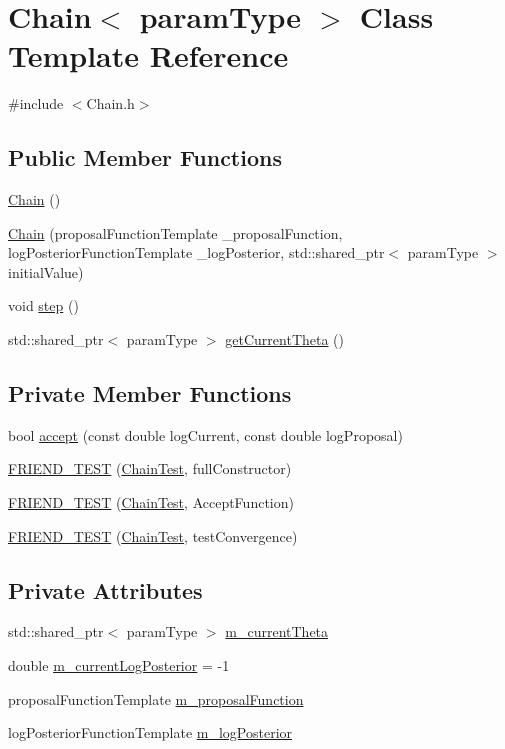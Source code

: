 \hypertarget{classChain}{
\section{Chain$<$ paramType $>$ Class Template Reference}
\label{classChain}
}


{\ttfamily \#include $<$Chain.h$>$}\subsection*{Public Member Functions}
\begin{DoxyCompactItemize}
\item 
\hyperlink{classChain_aa81d495a22785798908076ef5e3191a6}{Chain} ()
\item 
\hyperlink{classChain_ad4bad1f133e8be218275f2b900146840}{Chain} (proposalFunctionTemplate \_\-proposalFunction, logPosteriorFunctionTemplate \_\-logPosterior, std::shared\_\-ptr$<$ paramType $>$ initialValue)
\item 
void \hyperlink{classChain_ad6c694578319523237aa7ee355e9d044}{step} ()
\item 
std::shared\_\-ptr$<$ paramType $>$ \hyperlink{classChain_a44e04b0bc061e651dec369b09b23c226}{getCurrentTheta} ()
\end{DoxyCompactItemize}
\subsection*{Private Member Functions}
\begin{DoxyCompactItemize}
\item 
bool \hyperlink{classChain_a64914a49d1beaea22ef0b3f6464dde8e}{accept} (const double logCurrent, const double logProposal)
\item 
\hyperlink{classChain_ae738aa544270ab0d3c8e3b03872e1cd0}{FRIEND\_\-TEST} (\hyperlink{classChainTest}{ChainTest}, fullConstructor)
\item 
\hyperlink{classChain_ae504fe7678e62b1ee82aff0ebca3e02b}{FRIEND\_\-TEST} (\hyperlink{classChainTest}{ChainTest}, AcceptFunction)
\item 
\hyperlink{classChain_a35c0fda2749e3cfa99a51bb7488e1849}{FRIEND\_\-TEST} (\hyperlink{classChainTest}{ChainTest}, testConvergence)
\end{DoxyCompactItemize}
\subsection*{Private Attributes}
\begin{DoxyCompactItemize}
\item 
std::shared\_\-ptr$<$ paramType $>$ \hyperlink{classChain_a5c622bbc0157b867ec3cee1d398d8675}{m\_\-currentTheta}
\item 
double \hyperlink{classChain_a1ce0a9a0fa6263b3285696a856ce6f4c}{m\_\-currentLogPosterior} = -\/1
\item 
proposalFunctionTemplate \hyperlink{classChain_aa674eece174b4da338182f4eee458b3e}{m\_\-proposalFunction}
\item 
logPosteriorFunctionTemplate \hyperlink{classChain_a00ed020668792957c11c7e8b6b9eb0bd}{m\_\-logPosterior}
\end{DoxyCompactItemize}
